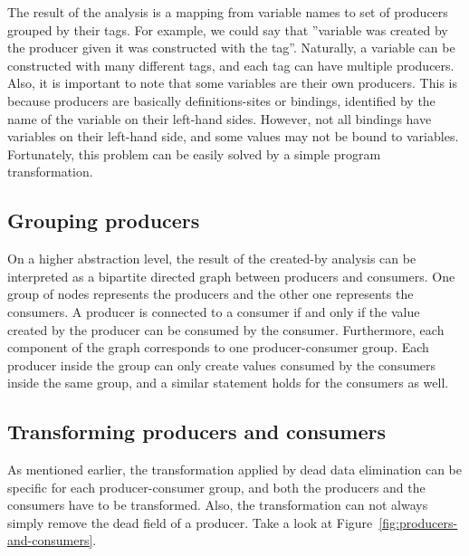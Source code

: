 \documentclass[main.tex]{subfiles}
\begin{document}
	The result of the analysis is a mapping from variable names to set of producers grouped by their tags. For example, we could say that ''variable  was created by the producer  given it was constructed with the  tag''. Naturally, a variable can be constructed with many different tags, and each tag can have multiple producers. Also, it is important to note that some variables are their own producers. This is because producers are basically definitions-sites or bindings, identified by the name of the variable on their left-hand sides. However, not all bindings have variables on their left-hand side, and some values may not be bound to variables. Fortunately, this problem can be easily solved by a simple program transformation.
	
	
	\subsection{Grouping producers}
	
	On a higher abstraction level, the result of the created-by analysis can be interpreted as a bipartite directed graph between producers and consumers. One group of nodes represents the producers and the other one represents the consumers. A producer is connected to a consumer if and only if the value created by the producer can be consumed by the consumer. Furthermore, each component of the graph corresponds to one producer-consumer group. Each producer inside the group can only create values consumed by the consumers inside the same group, and a similar statement holds for the consumers as well.
	
	\subsection{Transforming producers and consumers}
	\label{subsec:producers-and-consumers}
	
	As mentioned earlier, the transformation applied by dead data elimination can be specific for each producer-consumer group, and both the producers and the consumers have to be transformed. Also, the transformation can not always simply remove the dead field of a producer. Take a look at Figure~\ref{fig:producers-and-consumers}. 
	
\end{document}
